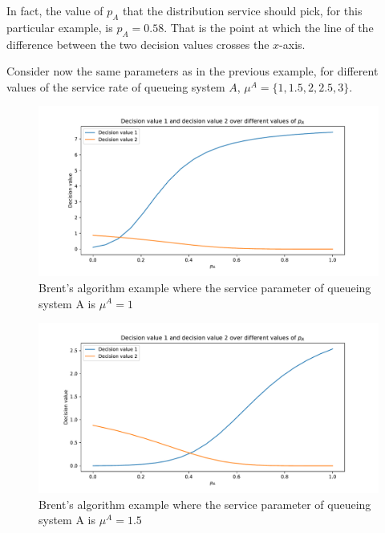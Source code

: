 In fact, the value of \(p_A\) that the distribution service should pick, for
this particular example, is \(p_A = 0.58\).
That is the point at which the line of the difference between the two decision
values crosses the \(x\)-axis.

Consider now the same parameters as in the previous example, for different
values of the service rate of queueing system \(A\), \(\mu^A =
\{1,1.5,2,2.5,3\}\).

\begin{figure}[H]
    \centering
    \includegraphics[width=\textwidth]{chapters/04_game_theoretic_model/Bin/brents_method/brent_method_example_mu_A_1.0.pdf}
    \caption{Brent's algorithm example where the service parameter of queueing
    system A is \(\mu^A = 1\)}
    \label{fig:brent_method_example_mu_A_1}
\end{figure}

\begin{figure}[H]
    \centering
    \includegraphics[width=\textwidth]{chapters/04_game_theoretic_model/Bin/brents_method/brent_method_example_mu_A_1.5.pdf}
    \caption{Brent's algorithm example where the service parameter of queueing
    system A is \(\mu^A = 1.5\)}
    \label{fig:brent_method_example_mu_A_2}
\end{figure}

